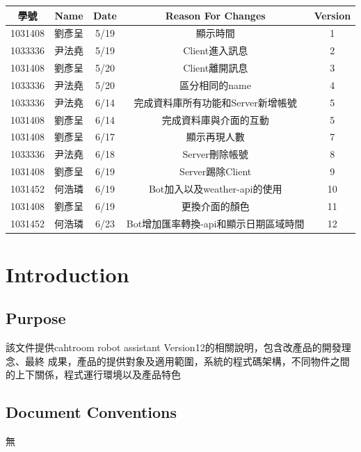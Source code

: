 \documentclass{scrreprt}
\begin{document}
\begin{CJK}{UTF8}{bkai}
	\begin{center}
    		\begin{tabular}{|c|c|c|c|c|}
        		\hline
	    	學號 & Name & Date & Reason For Changes & Version\\
        		\hline
	   	1031408 & 劉彥呈 & 5/19 & 顯示時間 & 1\\
        		\hline
	    	1033336 & 尹法堯 & 5/19 & Client進入訊息 & 2\\
        		\hline
		1031408 & 劉彥呈 & 5/20 & Client離開訊息 & 3\\
        		\hline
		1033336 & 尹法堯 & 5/20 & 區分相同的name & 4\\
        		\hline
		1033336 & 尹法堯 & 6/14 & 完成資料庫所有功能和Server新增帳號 & 5\\
		\hline
		1031408 & 劉彥呈 & 6/14 & 完成資料庫與介面的互動 & 5\\
        		\hline
		1031408 & 劉彥呈 & 6/17 & 顯示再現人數 & 7\\
        		\hline
		1033336 & 尹法堯 & 6/18 &  Server刪除帳號& 8\\
        		\hline
		1031408 & 劉彥呈 & 6/19 & Server踢除Client & 9\\
        		\hline
		1031452 & 何浩璘 & 6/19 & Bot加入以及weather-api的使用 & 10\\
        		\hline
		1031408 & 劉彥呈 & 6/19 & 更換介面的顏色 & 11\\
        		\hline
		1031452 & 何浩璘 & 6/23 & Bot增加匯率轉換-api和顯示日期區域時間 & 12\\
        		\hline
    		\end{tabular}
	\end{center}


\chapter{Introduction}

\section{Purpose}
該文件提供cahtroom robot assistant Version12的相關說明，包含改產品的開發理念、最終
成果，產品的提供對象及適用範圍，系統的程式碼架構，不同物件之間的上下關係，程式運行環境以及產品特色

\section{Document Conventions}
無


\end{CJK}
\end{document}
